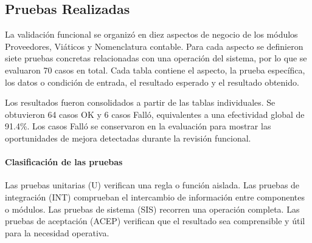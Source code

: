 \subsection{Pruebas Realizadas}
\label{sec:cap4_pruebas_realizadas}

La validación funcional se organizó en diez aspectos de negocio de los módulos Proveedores, Viáticos y Nomenclatura contable. Para cada aspecto se definieron siete pruebas concretas relacionadas con una operación del sistema, por lo que se evaluaron 70 casos en total. Cada tabla contiene el aspecto, la prueba específica, los datos o condición de entrada, el resultado esperado y el resultado obtenido.

Los resultados fueron consolidados a partir de las tablas individuales. Se obtuvieron 64 casos OK y 6 casos Falló, equivalentes a una efectividad global de 91.4\%. Los casos Falló se conservaron en la evaluación para mostrar las oportunidades de mejora detectadas durante la revisión funcional.

\paragraph{Clasificación de las pruebas}
Las pruebas unitarias (U) verifican una regla o función aislada. Las pruebas de integración (INT) comprueban el intercambio de información entre componentes o módulos. Las pruebas de sistema (SIS) recorren una operación completa. Las pruebas de aceptación (ACEP) verifican que el resultado sea comprensible y útil para la necesidad operativa.

